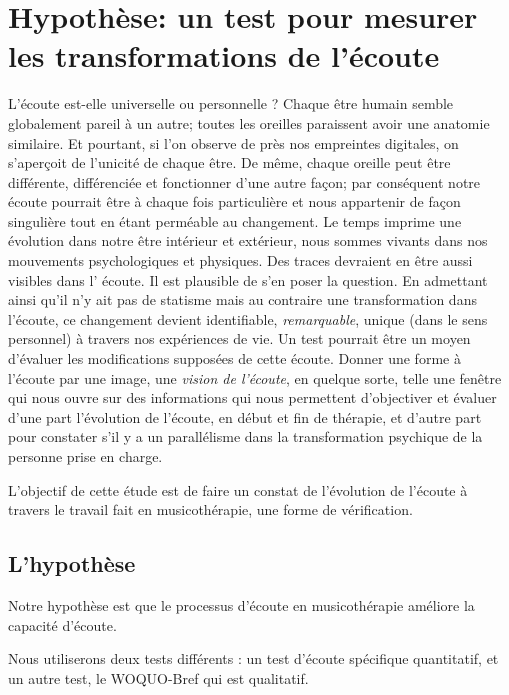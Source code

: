 \section{Hypothèse: un test pour mesurer les trans\-for\-ma\-tions de l'écoute}

L'écoute est-elle universelle ou personnelle ?
 Chaque être humain semble  globalement pareil à un autre; toutes les oreilles 
paraissent  avoir une anatomie similaire. Et pourtant, si l'on observe de près 
nos empreintes digitales, on s'aperçoit de l'unicité de chaque être. De même, 
chaque oreille peut être différente, différenciée et  fonctionner d'une autre 
façon;  par conséquent notre  écoute pourrait être à chaque fois particulière 
et nous appartenir de façon singulière tout en étant perméable au changement.
Le temps imprime une évolution dans notre être intérieur et extérieur, nous 
sommes vivants dans nos mouvements psychologiques et physiques. Des traces 
devraient en être aussi visibles dans l' écoute. Il est plausible de s'en poser 
la question.
En admettant ainsi qu'il n'y ait pas de statisme mais au contraire une 
transformation dans l'écoute, ce changement devient identifiable, 
\textit{remarquable}, unique (dans le sens personnel) à travers nos expériences 
de vie.  Un test pourrait être un moyen d'évaluer les modifications supposées 
de cette écoute. 
Donner une forme à l'écoute par une image, une \emph{vision de l'écoute}, en 
quelque sorte, telle une fenêtre qui nous ouvre sur des informations qui nous 
permettent d'objectiver et évaluer d'une part 
 l'évolution de l'écoute, en début et fin de thérapie, et d'autre part pour 
constater s'il y a un parallélisme dans la transformation psychique  de la 
personne prise en charge.

L'objectif de cette étude est de faire un constat de l'évolution de l'écoute à travers le travail fait en 
musicothérapie, une forme de vérification. 


\subsection{L'hypothèse}

Notre hypothèse est que le processus d'écoute en musicothérapie améliore la capacité d'écoute.
	
Nous utiliserons deux tests différents : 
un test d'écoute spécifique quantitatif, 
et un autre test, le WOQUO-Bref qui est qualitatif.

